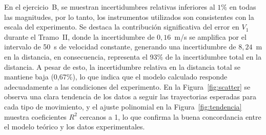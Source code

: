 En el ejercicio~B, se muestran incertidumbres relativas inferiores al $1\%$ 
en todas las magnitudes, por lo tanto, los instrumentos utilizados son 
consistentes con la escala del experimento. Se destaca la contribución 
significativa del error en $V_1$ durante el Tramo~II, donde la 
incertidumbre de $0{,}16$~m/s se amplifica por el intervalo de 50~s de velocidad constante,
generando una incertidumbre de $8{,}24$~m en la distancia, en consecuencia, 
representa el 93\% de la incertidumbre total en la distancia. A pesar de esto, 
la incertidumbre relativa en la distancia total se mantiene baja (0{,}67\%), 
lo que indica que el modelo calculado responde adecuadamente a las condiciones 
del experimento. En la Figura~\ref{fig:scatter} se observa una clara 
tendencia de los datos a seguir las trayectorias esperadas 
para cada tipo de movimiento, y el ajuste polinomial en la 
Figura~\ref{fig:tendencia} muestra coeficientes $R^2$ cercanos a 1, 
lo que confirma la buena concordancia entre el modelo teórico y los datos experimentales.
